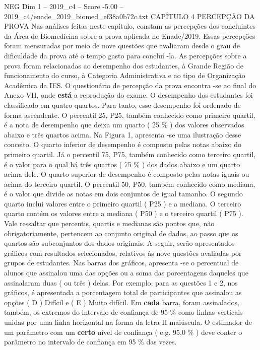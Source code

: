\begin{textsample}{NEG Dim 1 – 2019\_c4 – Score -5.00 – 2019\_c4/enade\_2019\_biomed\_ef38a0b72c.txt}  \label{ex:f1_neg_084}
CAPÍTULO 4 PERCEPÇÃO DA PROVA Nas análises feitas neste capítulo, constam as percepções dos concluintes da Área de Biomedicina sobre a prova aplicada no Enade/2019.
Essas percepções foram mensuradas por meio de nove questões que avaliaram desde o grau de dificuldade da prova até o tempo gasto para concluí -la.
As percepções sobre a prova foram relacionadas ao desempenho dos estudantes, à Grande Região de funcionamento do curso, à Categoria Administrativa e ao tipo de Organização Acadêmica da IES.
O questionário de percepção da prova encontra -se ao final do Anexo VII, onde \textbf{está} a reprodução do exame.
O desempenho dos estudantes foi classificado em quatro quartos.
Para tanto, esse desempenho foi ordenado de forma ascendente.
O percentil 25, P25, também conhecido como primeiro quartil, é a nota de desempenho que deixa um quarto ( 25 \% ) dos valores observados abaixo e três quartos acima.
Na Figura 1, apresenta -se uma ilustração desse conceito.
O quarto inferior de desempenho é composto pelas notas abaixo do primeiro quartil.
Já o percentil 75, P75, também conhecido como terceiro quartil, é o valor para o qual há três quartos ( 75 \% ) dos dados abaixo e um quarto acima dele.
O quarto superior de desempenho é composto pelas notas iguais ou acima do terceiro quartil.
O percentil 50, P50, também conhecido como mediana, é o valor que divide as notas em dois conjuntos de igual tamanho.
O segundo quarto inclui valores entre o primeiro quartil ( P25 ) e a mediana.
O terceiro quarto contém os valores entre a mediana ( P50 ) e o terceiro quartil ( P75 ).
Vale ressaltar que percentis, quartis e medianas são pontos que, não obrigatoriamente, pertencem ao conjunto original de dados, ao passo que os quartos são subconjuntos dos dados originais.
A seguir, serão apresentados gráficos com resultados selecionados, relativos às nove questões avaliadas por grupos de estudantes.
Nas barras dos gráficos, apresenta -se o percentual de alunos que assinalou uma das opções ou a soma das porcentagens daqueles que assinalaram duas ( ou três ) delas.
Por exemplo, para as questões 1 e 2, nos gráficos, é apresentada a porcentagem total de participantes que assinalou as opções ( D ) Difícil e ( E ) Muito difícil.
Em \textbf{cada} barra, foram assinalados, também, os extremos do intervalo de confiança de 95 \% como linhas verticais unidas por uma linha horizontal na forma da letra H maiúscula.
O estimador de um parâmetro com um \textbf{certo} nível de confiança ( e.g. 95,0 \% ) deve conter o parâmetro no intervalo de confiança em 95 \% das vezes.

\end{textsample}
